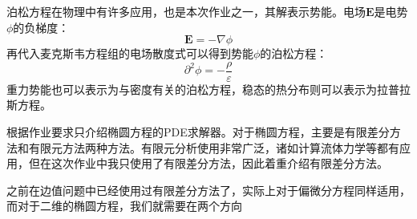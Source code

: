 \documentclass[UTF8,a4paper,10pt]{ctexart}
\begin{document}
\begin{multicols}{2}
            泊松方程在物理中有许多应用，也是本次作业之一，其解表示势能。电场$\bm{E}$是电势$\phi$的负梯度：
            \begin{equation}
                \bm{E} = -\nabla\phi
            \end{equation}
            再代入麦克斯韦方程组的电场散度式可以得到势能$\phi$的泊松方程：
            \begin{equation}
                \partial^2\phi = -\frac{\rho}{\varepsilon}
            \end{equation}
            重力势能也可以表示为与密度有关的泊松方程，稳态的热分布则可以表示为拉普拉斯方程。\par
            根据作业要求只介绍椭圆方程的PDE求解器。对于椭圆方程，主要是有限差分方法和有限元方法两种方法。有限元分析使用非常广泛，诸如计算流体力学等都有应用，但在这次作业中我只使用了有限差分方法，因此着重介绍有限差分方法。\par
            之前在边值问题中已经使用过有限差分方法了，实际上对于偏微分方程同样适用，而对于二维的椭圆方程，我们就需要在两个方向
\end{multicols}
\end{document}
